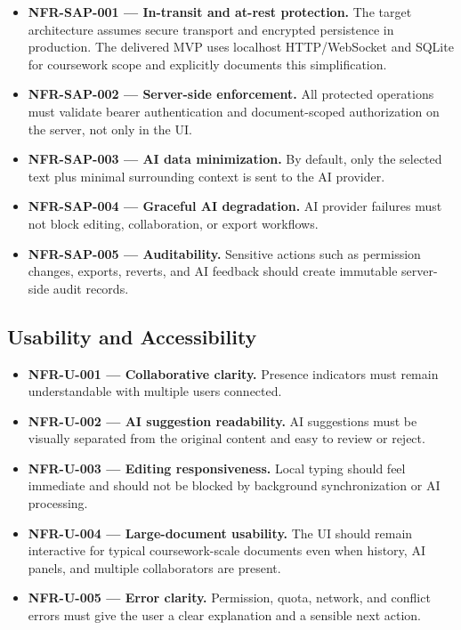 \begin{itemize}
  \item \textbf{NFR-SAP-001 --- In-transit and at-rest protection.} The target architecture assumes secure
  transport and encrypted persistence in production. The delivered MVP uses localhost HTTP/WebSocket and
  SQLite for coursework scope and explicitly documents this simplification.
  \item \textbf{NFR-SAP-002 --- Server-side enforcement.} All protected operations must validate bearer
  authentication and document-scoped authorization on the server, not only in the UI.
  \item \textbf{NFR-SAP-003 --- AI data minimization.} By default, only the selected text plus minimal
  surrounding context is sent to the AI provider.
  \item \textbf{NFR-SAP-004 --- Graceful AI degradation.} AI provider failures must not block editing,
  collaboration, or export workflows.
  \item \textbf{NFR-SAP-005 --- Auditability.} Sensitive actions such as permission changes, exports,
  reverts, and AI feedback should create immutable server-side audit records.
\end{itemize}

\subsection{Usability and Accessibility}

\begin{itemize}
  \item \textbf{NFR-U-001 --- Collaborative clarity.} Presence indicators must remain understandable with
  multiple users connected.
  \item \textbf{NFR-U-002 --- AI suggestion readability.} AI suggestions must be visually separated from the
  original content and easy to review or reject.
  \item \textbf{NFR-U-003 --- Editing responsiveness.} Local typing should feel immediate and should not be
  blocked by background synchronization or AI processing.
  \item \textbf{NFR-U-004 --- Large-document usability.} The UI should remain interactive for typical
  coursework-scale documents even when history, AI panels, and multiple collaborators are present.
  \item \textbf{NFR-U-005 --- Error clarity.} Permission, quota, network, and conflict errors must give the
  user a clear explanation and a sensible next action.
\end{itemize}

